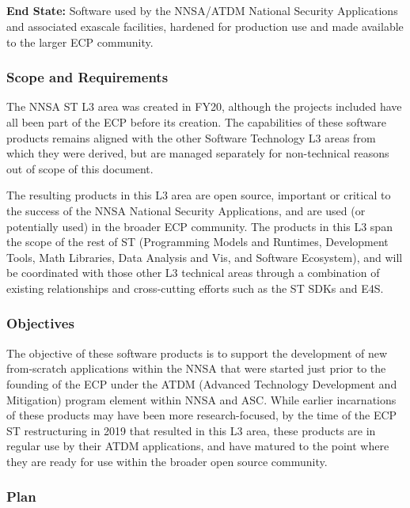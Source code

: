 \subsection{ \nnsa}\label{subsect:nnsa}

\textbf{End State:} Software used by the NNSA/ATDM National Security
Applications and associated exascale facilities, hardened for
production use and made available to the larger ECP community.

\subsubsection{Scope and Requirements}
The NNSA ST L3 area was created in FY20, although the projects included
have all been part of the ECP before its creation. The capabilities of these
software products remains aligned with the other Software Technology
L3 areas from which they were derived, but are managed separately for
non-technical reasons out of scope of this document.

The resulting products in this L3 area 
are open source, important or critical to the success of the NNSA
National Security Applications, and are used (or potentially used) in
the broader ECP community. The products in this L3 span the scope of
the rest of ST (Programming Models and Runtimes, Development Tools,
Math Libraries, Data Analysis and Vis, and Software Ecosystem), and
will be coordinated with those other L3 technical 
areas through a combination of existing relationships and
cross-cutting efforts such as the ST SDKs and E4S.  

\subsubsection{Objectives}

The objective of these software products is to support the
development of new from-scratch applications within the NNSA that were
started just prior to the founding of the ECP under the ATDM (Advanced
Technology Development and Mitigation) program element within NNSA and
ASC. While earlier incarnations of these products may have been more
research-focused, by the time of the ECP ST restructuring in 2019 that
resulted in this L3 area, these products are in regular use by their
ATDM applications, and have matured to the point where they are ready
for use within the broader open source community.

\subsubsection{Plan}


